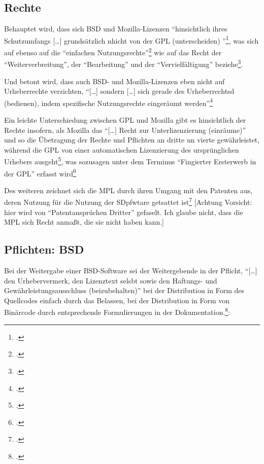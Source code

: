 \documentclass[DIV=calc,BCOR=5mm,11pt,headings=small,oneside,abstract=true, toc=bib]{scrartcl}
\begin{document}
\subsection{Rechte}

Behauptet wird, dass sich BSD und Mozilla-Lizenzen \enquote{hinsichtlich
ihres Schutzumfangs [\ldots] grundsätzlich nhicht von der GPL (unterscheiden)
}\footcite[vgl.][323]{ArlBriVol2004a}, was sich auf ebenso auf die
\enquote{einfachen Nutzungsrechte}\footcite[vgl.][324]{ArlBriVol2004a} wie
auf das Recht der \enquote{Weiterverbreitung}, der \enquote{Bearbeitung}
und der \enquote{Vervielfältigung}
beziehe\footcite[vgl.][325]{ArlBriVol2004a}.

Und betont wird, dass auch BSD- und Mozilla-Lizenzen eben nicht auf
Urheberrechte verzichten, \enquote{[\ldots] sondern [\ldots] sich gerade
des Urheberrechtsd (bedienen), indem spezifische Nutzungsrechte
eingeräumt werden}\footcite[vgl.][324]{ArlBriVol2004a}

Ein leichte Unterschiedung zwischen GPL und Mozilla gibt es hinsichtlich der
Rechte insofern, als Mozilla das \enquote{[\ldots] Recht zur
Unterlizenzierung (einräume)} und so die Übetragung der Rechte und
Pflichten an dritte un vierte gewährleistet, während die GPL von einer
automatischen Lizenzierung des ursprünglichen Urhebers
ausgeht\footcite[vgl.][329]{ArlBriVol2004a}, was sozusagen unter dem Terminus
\enquote{Fingierter Ersterwerb in der GPL} erfasst
wird\footcite[vgl.][331]{ArlBriVol2004a}

Des weiteren zeichnet sich die MPL durch ihren Umgang mit den Patenten aus,
deren Nutzung für die Nutzung der SDpfwtare getsattet
ist\footcite[vgl.][330]{ArlBriVol2004a}  [Achtung Vorsicht: hier wird von
\enquote{Patentansprüchen Dritter} gefaselt. Ich glaube nicht, dass die MPL
sich Recht anmaßt, die sie nicht haben kann.]


\subsection{Pflichten: BSD}

Bei der Weitergabe einer BSD-Software sei der Weitergebende in der Pflicht,
\enquote{[\ldots] den Urhebervermerk, den Lizenztext selsbt sowie den
Haftungs- und Gewährleistungsausschluss
(beizubehalten)} bei der
Distribution in Form des Quellcodes einfach durch das Belassen, bei der
Distribution in Form von Binärcode durch entsprechende Formulierungen in der
Dokumentation.\footcite[vgl.][343]{ArlBriVol2004a}:
\end{document}
